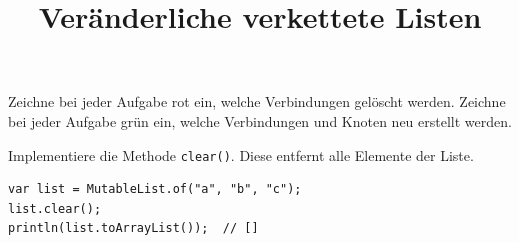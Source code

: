 \documentclass[a4paper]{scrartcl}
\date{}
\title{Veränderliche verkettete Listen}
\begin{document}
Zeichne bei jeder Aufgabe rot ein, welche Verbindungen gelöscht werden.
Zeichne bei jeder Aufgabe grün ein, welche Verbindungen und Knoten neu erstellt werden.
\begin{aufgabe}[subtitle = Aufgabe 13]
Implementiere die Methode \texttt{clear()}. Diese entfernt alle Elemente der Liste.

\begin{verbatim}
var list = MutableList.of("a", "b", "c");
list.clear();
println(list.toArrayList());  // []
\end{verbatim}



\begin{center}
\end{center}
\vspace{2cm}
\end{aufgabe}
\end{document}
